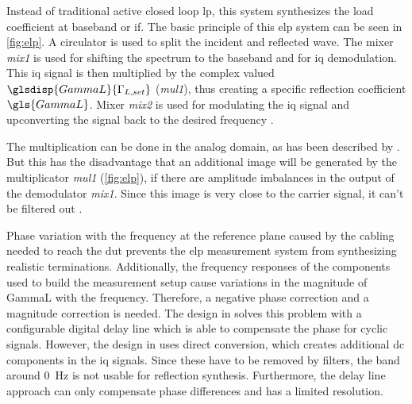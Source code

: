 \documentclass[12pt,a4paper,parskip=full,abstract=true,BCOR=12mm]{scrreprt}
\def\device#1{\mbox{\textit{#1}}}
\begin{document}
Instead of traditional active closed loop \gls{lp}, this system synthesizes the
load coefficient at baseband or \gls{if}. The basic principle of this \gls{elp} system
can be seen in \cref{fig:elp}. A circulator is used to split the incident and
reflected wave. The mixer \device{mix1} is used for shifting the spectrum to
the baseband and for \gls{iq} demodulation. This \gls{iq} signal is then
multiplied by the complex valued $\glsdisp{GammaL}{\Gamma_{L,set}}$ (\device{mul1}), thus creating a specific
reflection coefficient $\gls{GammaL}$. Mixer \device{mix2} is used for modulating
the \gls{iq} signal and upconverting the signal back to the desired frequency \cite{williams_experimental_2005}.

The multiplication can be done in the analog domain, as has been described
by \cite{williams_experimental_2005}. But this has the disadvantage that
an additional image will be generated by the multiplicator \device{mul1} (\cref{fig:elp}),
if there are amplitude imbalances in the output
of the demodulator \device{mix1}. Since this image is very close to the
carrier signal, it can't be filtered out \cite{hashmi_agile_2010}.

Phase variation with the frequency at the reference plane caused by the
cabling needed to reach the \gls{dut} prevents the \gls{elp} measurement
system from synthesizing realistic terminations. Additionally, the frequency
responses of the components used to build the measurement setup cause variations
in the magnitude of \gls{GammaL} with the frequency. Therefore, a negative
phase correction and a magnitude correction is needed. The design in \cite{hashim_active_2008} solves
this problem with a configurable digital delay line which is able to compensate
the phase for cyclic signals. However, the design in
\cite{hashim_active_2008} uses direct conversion, which creates additional
\gls{dc} components in the \gls{iq} signals. Since these have to be removed
by filters, the band around \SI{0}{\hertz} is not usable for reflection
synthesis. Furthermore, the delay line approach can only compensate
phase differences and has a limited resolution.
\end{document}
